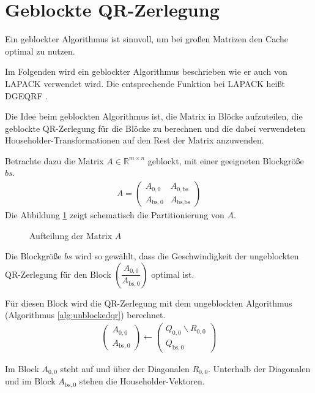 \newpage
\section{Geblockte QR-Zerlegung}
Ein geblockter Algorithmus ist sinnvoll, um bei großen Matrizen den Cache optimal zu nutzen.

Im Folgenden wird ein geblockter Algorithmus beschrieben wie er auch von LAPACK verwendet wird. Die entsprechende Funktion bei LAPACK heißt \glqq DGEQRF\grqq{} \cite{DGEQRF}.

Die Idee beim geblockten Algorithmus ist, die Matrix in Blöcke aufzuteilen, die geblockte QR-Zerlegung für die Blöcke zu berechnen und die dabei verwendeten Householder-Transformationen auf den Rest der Matrix anzuwenden.

Betrachte dazu die Matrix $A \in \mathbb{R}^{m \times n}$ geblockt, mit einer geeigneten Blockgröße $bs$.
\begin{align}
	A = \left(\begin{array}{l|l}
	A_{0, 0} & A_{0, \text{bs}} \\ \hline
	A_{\text{bs}, 0}   & A_{\text{bs}, \text{bs}} 	
	\end{array} \right) \label{equ:blockA}
\end{align}
Die Abbildung \ref{fig:blockA} zeigt schematisch die Partitionierung von $A$.

\begin{figure}[H]
	\centering
	
	\caption{Aufteilung der Matrix $A$}
	\label{fig:blockA}
\end{figure}

Die Blockgröße $bs$ wird so gewählt, dass die Geschwindigkeit der ungeblockten QR-Zerlegung für den Block $ \left(\dfrac{A_{0, 0}}{A_{\text{bs}, 0}} \right)$ optimal ist.

Für diesen Block wird die  QR-Zerlegung mit dem ungeblockten Algorithmus (Algorithmus \ref{alg:unblockedqr}) berechnet.
\begin{align}
	\left(\begin{array}{l} 
	A_{0, 0} \\ \hline
	A_{\text{bs}, 0}
	\end{array}\right)
	\leftarrow
	\left(\begin{array}{l} 
	Q_{0, 0}  \backslash R_{0,0} \\ \hline
	Q_{\text{bs}, 0} 
	\end{array}\right)
\end{align}

Im Block $A_{0, 0}$ steht auf und über der Diagonalen $R_{0,0}$. Unterhalb der Diagonalen und im Block $A_{\text{bs}, 0}$ stehen die Householder-Vektoren.


